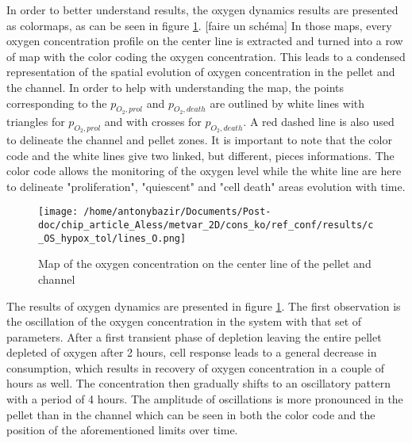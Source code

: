 \documentclass[11pt,a4paper]{article}
\begin{document}
In order to better understand results, the oxygen dynamics results are presented as colormaps, as can be seen in figure \ref{ref_map}. [faire un schéma] In those maps,
 every oxygen concentration profile on the center line is extracted and turned into a row of map with the color coding the oxygen concentration. This leads to a condensed representation of the spatial evolution of oxygen concentration in the pellet and the channel. In order to help with understanding the map, the points corresponding to the $p_{O_2,prol}$ and $p_{O_2,death}$ are outlined by white lines with triangles for  $p_{O_2,prol}$ and with crosses for $p_{O_2,death}$. A red dashed line is also used to delineate the channel and pellet zones.  It is important to note that the color code and the white lines give two linked, but different, pieces informations. The color code allows the monitoring of the oxygen level while the white line are here to delineate "proliferation", "quiescent" and "cell death" areas evolution with time. 

\begin{figure}[ht!]
\centering
\texttt{[image: /home/antonybazir/Documents/Post-doc/chip\_article\_Aless/metvar\_2D/cons\_ko/ref\_conf/results/c\_OS\_hypox\_tol/lines\_O.png]}
\caption{ Map of the oxygen concentration on the center line of the pellet and channel  \label{ref_map}}
\end{figure}

The results of oxygen dynamics are presented in figure \ref{ref_map}. The first observation is the oscillation of the oxygen concentration in the system with that set of parameters. After a first transient phase of depletion leaving the entire pellet depleted of oxygen after 2 hours, cell response leads to a general decrease in consumption, which results in recovery of oxygen concentration in a couple of hours as well. The concentration then gradually shifts to an oscillatory pattern with a period of 4 hours. The amplitude of oscillations is more pronounced in the pellet than in the channel which can be seen in both the color code and the position of the aforementioned limits over time.
\end{document}
